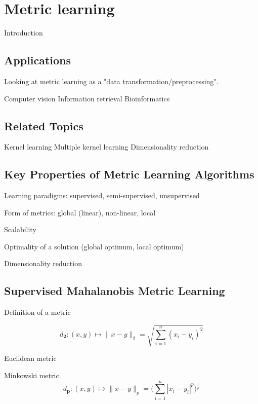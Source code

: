 \documentclass[12pt,a4paper]{report}
\begin{document}

\chapter{Metric learning}

Introduction

\section{Applications}

Looking at metric learning as a "data transformation/preprocessing".

Computer vision
Information retrieval
Bioinformatics

\section{Related Topics}

Kernel learning
Multiple kernel learning
Dimensionality reduction

\section{Key Properties of Metric Learning Algorithms}

Learning paradigms: supervised, semi-supervised, unsupervised

Form of metrics: global (linear), non-linear, local

Scalability

Optimality of a solution (global optimum, local optimum)

Dimensionality reduction

\section{Supervised Mahalanobis Metric Learning}

Definition of a metric

\begin{equation} 
d_{\mathbf{2}} : (x, y) \mapsto \|x-y\|_2 = \sqrt{\sum_{i=1}^{n} (x_i-y_i)^2}
\end{equation}

Euclidean metric

Minkowski metric
\begin{equation}
d_{\mathbf{p}} : (x, y) \mapsto \|x-y\|_p = \bigg(\sum_{i=1}^{n} |x_i-y_i|^p\bigg)^\frac{1}{p}
\end{equation}
\end{document}
